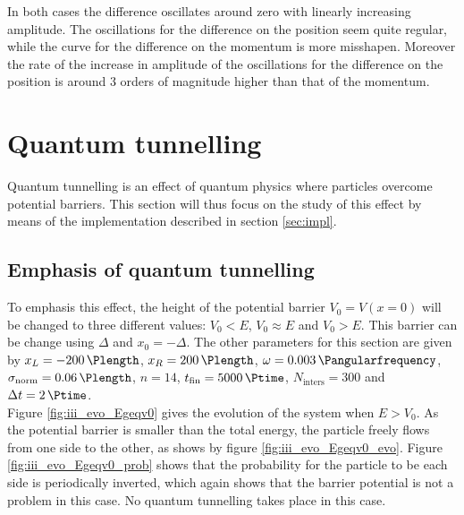 \documentclass[a4paper,12pt,twoside]{article}
\begin{document}
In both cases the difference oscillates around zero with linearly increasing amplitude. The oscillations for the difference on the position seem quite regular, while the curve for the difference on the momentum is more misshapen. Moreover the rate of the increase in amplitude of the oscillations for the difference on the position is around 3 orders of magnitude higher than that of the momentum.


\newpage
\section{Quantum tunnelling}\label{sec:quantum_tunnelling}
  Quantum tunnelling is an effect of quantum physics where particles overcome potential barriers. \cite{wiki:quantum_tunnelling}
  This section will thus focus on the study of this effect by means of the implementation described in section \ref{sec:impl}.\\

  \subsection{Emphasis of quantum tunnelling}
    To emphasis this effect, the height of the potential barrier $V_0 = V(x=0)$ will be changed to three different values: $V_0<E$, $V_0 \approx E$ and $V_0>E$.
    This barrier can be change using $\Delta$ and $x_0 = -\Delta$.
    The other parameters for this section are given by $x_L=\SI{-200}{\Plength}$, $x_R=\SI{200}{\Plength}$, $\omega = \SI{0.003}{\Pangularfrequency}$, $\sigma_\text{norm} = \SI{0.06}{\Plength}$, $n=14$, $t_\text{fin} = \SI{5000}{\Ptime}$, $N_\text{inters} = 300$ and $\Delta t = \SI{2}{\Ptime}$.\\

    Figure \ref{fig:iii_evo_Egeqv0} gives the evolution of the system when $E > V_0$.
    As the potential barrier is smaller than the total energy, the particle freely flows from one side to the other, as shows by figure \ref{fig:iii_evo_Egeqv0_evo}.
    Figure \ref{fig:iii_evo_Egeqv0_prob} shows that the probability for the particle to be each side is periodically inverted, which again shows that the barrier potential is not a problem in this case.
    No quantum tunnelling takes place in this case.\\
\end{document}
